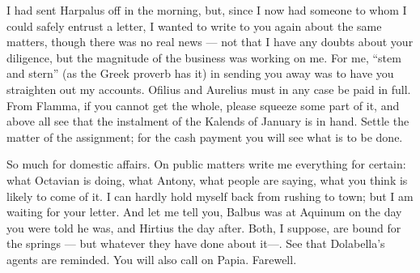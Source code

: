 

 I had sent Harpalus off in the morning, but, since I now had someone to whom I could safely entrust a letter, I wanted to write to you again about the same matters, though there was no real news --- not that I have any doubts about your diligence, but the magnitude of the business was working on me. For me, ``stem and stern'' (as the Greek proverb has it) in sending you away was to have you straighten out my accounts. Ofilius and Aurelius must in any case be paid in full. From Flamma, if you cannot get the whole, please squeeze some part of it, and above all see that the instalment of the Kalends of January is in hand. Settle the matter of the assignment; for the cash payment you will see what is to be done.

 So much for domestic affairs. On public matters write me everything for certain: what Octavian is doing, what Antony, what people are saying, what you think is likely to come of it. I can hardly hold myself back from rushing to town; but I am waiting for your letter. And let me tell you, Balbus was at Aquinum on the day you were told he was, and Hirtius the day after. Both, I suppose, are bound for the springs --- but whatever they have done about it---. See that Dolabella's agents are reminded. You will also call on Papia. Farewell.
